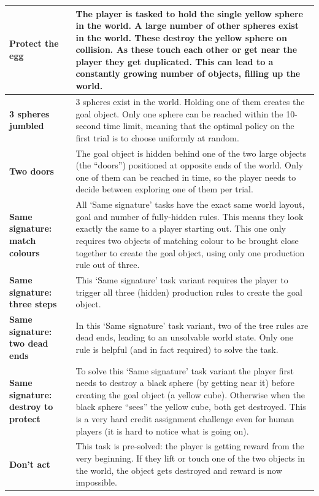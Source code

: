 \documentclass[11pt, a4paper, logo, copyright]{deepmind}
\begin{document}
\begin{appendix}
\begin{longtable}{|>{\raggedright}p{4cm}|p{12cm}|}
\textbf{Protect the egg} & The player is tasked to hold the single yellow sphere in the world. A large number of other spheres exist in the world. These destroy the yellow sphere on collision. As these touch each other or get near the player they get duplicated. This can lead to a constantly growing number of objects, filling up the world. \\ \hline
\textbf{3 spheres jumbled} & 3 spheres exist in the world. Holding one of them creates the goal object. Only one sphere can be reached within the 10-second time limit, meaning that the optimal policy on the first trial is to choose uniformly at random. \\ \hline
\textbf{Two doors} & The goal object is hidden behind one of the two large objects (the ``doors'') positioned at opposite ends of the world. Only one of them can be reached in time, so the player needs to decide between exploring one of them per trial. \\ \hline
\textbf{Same signature: match colours} & All `Same signature' tasks have the exact same world layout, goal and number of fully-hidden rules. This means they look exactly the same to a player starting out. This one only requires two objects of matching colour to be brought close together to create the goal object, using only one production rule out of three. \\ \hline
\textbf{Same signature: three steps} & This `Same signature' task variant requires the player to trigger all three (hidden) production rules to create the goal object. \\ \hline
\textbf{Same signature: two dead ends} & In this `Same signature' task variant, two of the tree rules are dead ends, leading to an unsolvable world state. Only one rule is helpful (and in fact required) to solve the task. \\ \hline
\textbf{Same signature: destroy to protect} & To solve this `Same signature' task variant the player first needs to destroy a black sphere (by getting near it) before creating the goal object (a yellow cube). Otherwise when the black sphere ``sees'' the yellow cube, both get destroyed. This is a very hard credit assignment challenge even for human players (it is hard to notice what is going on). \\ \hline
\textbf{Don't act} & This task is pre-solved: the player is getting reward from the very beginning. If they lift or touch one of the two objects in the world, the object gets destroyed and reward is now impossible. \\ \hline

\end{longtable}
\end{appendix}
\end{document}
